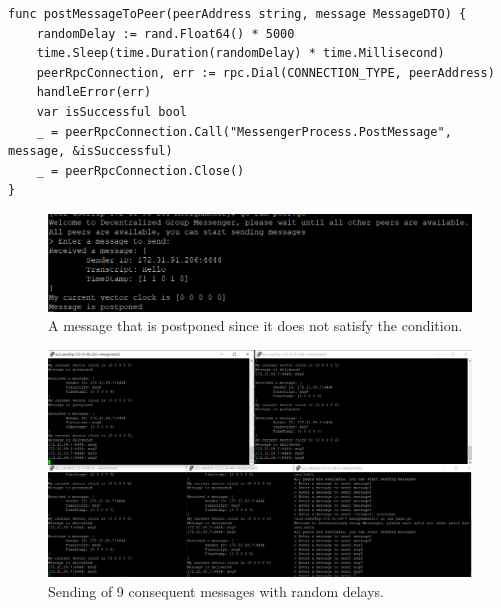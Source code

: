 \documentclass[a4paper]{article}
\begin{document}
\begin{lstlisting}[caption={\texttt{postMessageToPeer} helper function}]
func postMessageToPeer(peerAddress string, message MessageDTO) {
    randomDelay := rand.Float64() * 5000
    time.Sleep(time.Duration(randomDelay) * time.Millisecond)
    peerRpcConnection, err := rpc.Dial(CONNECTION_TYPE, peerAddress)
    handleError(err)
    var isSuccessful bool
    _ = peerRpcConnection.Call("MessengerProcess.PostMessage", message, &isSuccessful)
    _ = peerRpcConnection.Close()
}
\end{lstlisting}

\begin{figure}[!htb]
\centering
\includegraphics[width=\textwidth]{postpone.PNG}
\caption{{A message that is postponed since it does not satisfy the condition.}}
\end{figure}

\begin{figure}[!htb]
\centering
\includegraphics[width=\textwidth]{msg.PNG}
\caption{{Sending of 9 consequent messages with random delays.}}
\end{figure}
\end{document}
